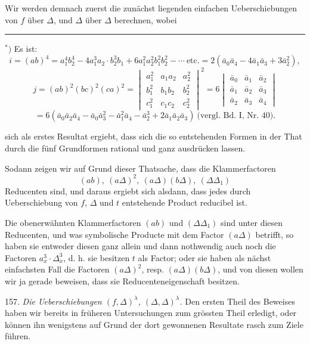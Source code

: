 \documentclass[11pt]{article}
\providecommand{\weberpage}[1]{}
\let\Delta\varDelta
\begin{document}
Wir werden demnach zuerst die zunächst liegenden einfachen Ueberschiebungen von $f$ über $\Delta$, und $\Delta$ über $\Delta$ berechnen, wobei

\par\noindent\rule{4cm}{0.4pt}\par
\noindent $^{\ast})$ Es ist:
\[
i=(ab)^4=a_1^4b_2^4-4a_1^3a_2\cdot b_2^3b_1+6a_1^2a_2^2b_1^2b_2^2-\cdots\ \text{etc.}=2(\bar a_0\bar a_4-4\bar a_1\bar a_3+3\bar a_2^2),
\]
\[
j=(ab)^2(bc)^2(ca)^2=\begin{vmatrix}a_1^2 & a_1a_2 & a_2^2\\ b_1^2 & b_1b_2 & b_2^2\\ c_1^2 & c_1c_2 & c_2^2\end{vmatrix}^2=6\begin{vmatrix}\bar a_0 & \bar a_1 & \bar a_2\\ \bar a_1 & \bar a_2 & \bar a_3\\ \bar a_2 & \bar a_3 & \bar a_4\end{vmatrix}
\]
\[
=6(\bar a_0\bar a_2\bar a_4-\bar a_0\bar a_3^2-\bar a_1^2\bar a_4-\bar a_2^3+2\bar a_1\bar a_2\bar a_3)\ \text{(vergl. Bd. I, Nr. 40).}
\]


\weberpage{180}
sich als erstes Resultat ergiebt, dass sich die so entstehenden Formen in der That durch die fünf Grundformen rational und ganz ausdrücken lassen.

Sodann zeigen wir auf Grund dieser Thatsache, dass die Klammerfactoren
\[
(ab),\ (a\Delta)^2,\ (a\Delta)(b\Delta),\ (\Delta\Delta_1)
\]
Reducenten sind, und daraus ergiebt sich alsdann, dass jedes durch Ueberschiebung von $f$, $\Delta$ und $t$ entstehende Product reducibel ist.

Die obenerwähnten Klammerfactoren $(ab)$ und $(\Delta\Delta_1)$ sind unter diesen Reducenten, und was symbolische Producte mit dem Factor $(a\Delta)$ betrifft, so haben sie entweder diesen ganz allein und dann nothwendig auch noch die Factoren $a_x^3\cdot\Delta_x^3$, d. h. sie besitzen $t$ als Factor; oder sie haben als nächst einfachsten Fall die Factoren $(a\Delta)^2$, resp. $(a\Delta)(b\Delta)$, und von diesen wollen wir ja gerade beweisen, dass sie Reducenteneigenschaft besitzen.

157. \textit{Die Ueberschiebungen $(f,\Delta)^\lambda$, $(\Delta,\Delta)^\lambda$.} Den ersten Theil des Beweises haben wir bereits in früheren Untersuchungen zum grössten Theil erledigt, oder können ihn wenigstens auf Grund der dort gewonnenen Resultate rasch zum Ziele führen.
\end{document}
